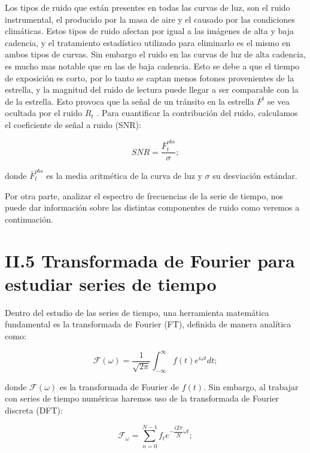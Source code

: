Los tipos de ruido que están presentes en todas las curvas de luz, son el ruido instrumental, el producido por la masa de aire y el causado por las condiciones climáticas. Estos tipos de ruido afectan por igual a las imágenes de alta y baja cadencia, y el tratamiento estadístico utilizado para eliminarlo es el mismo en ambos tipos de curvas. Sin embargo el ruido en las curvas de luz de alta cadencia, es mucho mas notable que en las de baja cadencia. Esto se debe a que el tiempo de exposición es corto, por lo tanto se captan menos fotones provenientes de la estrella, y la magnitud del ruido de lectura puede llegar a ser comparable con la de la estrella. Esto provoca que la señal de un tránsito en la estrella $F^{t}$  se vea ocultada por el ruido $R_{t}$ \cite{pont2006effect}. Para cuantificar la contribución del ruido, calculamos el coeficiente de señal a ruido (SNR):

\begin{equation}
  \displaystyle SNR=\dfrac{\bar{F}^{obs}_{t}}{\sigma};
\end{equation}

\noindent donde $\bar{F}^{obs}_{t}$ es la media aritmética de la curva de luz y $\sigma$ su desviación estándar.

Por otra parte, analizar el espectro de frecuencias de la serie de tiempo, nos puede dar información sobre las distintas componentes de ruido como veremos a continuación.

\section*{II.5 Transformada de Fourier para estudiar series de tiempo}

Dentro del estudio de las series de tiempo, una herramienta matemática fundamental es la transformada de Fourier (FT), definida de manera analítica como:

\begin{equation}
  \displaystyle \mathcal{F}(\omega )=\frac{1}{\sqrt{2\pi}}\int_{-\infty}^{\infty} f(t)e^{i\omega t}dt;
\end{equation}

\noindent donde $\mathcal{F}(\omega )$ es la transformada de Fourier de $f(t)$. Sin embargo, al trabajar con series de tiempo numéricas haremos uso de la transformada de Fourier discreta (DFT):  

\begin{equation}
  \displaystyle \mathcal{F}_{\omega}= \sum_{n=0}^{N-1} f_{t}e^{-\dfrac{i2\pi}{N}\omega t};
\end{equation}

